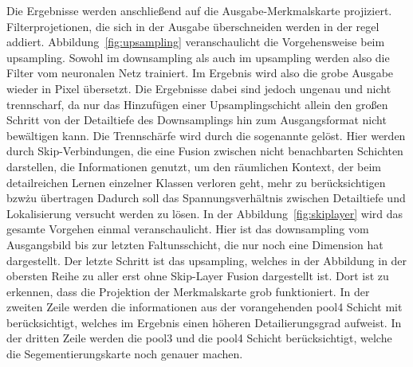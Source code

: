 Die Ergebnisse werden anschließend auf die Ausgabe-Merkmalskarte projiziert.
Filterprojetionen, die sich in der Ausgabe überschneiden werden in der regel addiert.
Abbildung~\ref{fig:upsampling} veranschaulicht die Vorgehensweise beim upsampling.
Sowohl im downsampling als auch im upsampling werden also die Filter vom neuronalen Netz trainiert.
Im Ergebnis wird also die grobe Ausgabe wieder in Pixel übersetzt.
Die Ergebnisse dabei sind jedoch ungenau und nicht trennscharf, da nur das Hinzufügen einer Upsamplingschicht allein
den großen Schritt von der Detailtiefe des Downsamplings hin zum Ausgangsformat nicht bewältigen kann.
Die Trennschärfe wird durch die sogenannte \grqq gelöst.
Hier werden durch Skip-Verbindungen, die eine Fusion zwischen nicht benachbarten Schichten darstellen, die Informationen
genutzt, um den räumlichen Kontext, der beim detailreichen Lernen einzelner Klassen verloren geht, mehr zu
berücksichtigen bzw\. zu übertragen
Dadurch soll das Spannungsverhältnis zwischen Detailtiefe und Lokalisierung versucht werden zu lösen.
In der Abbildung~\ref{fig:skiplayer} wird das gesamte Vorgehen einmal veranschaulicht.
Hier ist das downsampling vom Ausgangsbild bis zur letzten Faltunsschicht, die nur noch eine Dimension hat dargestellt.
Der letzte Schritt ist das upsampling, welches in der Abbildung in der obersten Reihe zu aller erst ohne Skip-Layer
Fusion dargestellt ist.
Dort ist zu erkennen, dass die Projektion der Merkmalskarte grob funktioniert.
In der zweiten Zeile werden die informationen aus der vorangehenden pool4 Schicht mit berücksichtigt, welches im Ergebnis
einen höheren Detailierungsgrad aufweist.
In der dritten Zeile werden die pool3 und die pool4 Schicht berücksichtigt, welche die Segementierungskarte noch genauer
machen.





